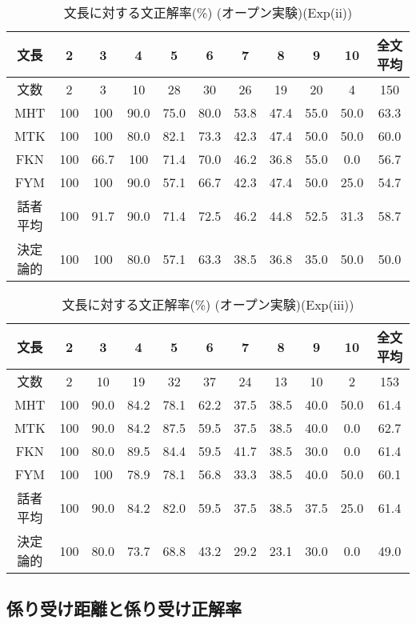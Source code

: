 \begin{table}
\begin{center}
\caption{文長に対する文正解率(\%) (オープン実験)(Exp(ii))}
\label{res:10}
\begin{tabular}{|c|c|c|c|c|c|c|c|c|c||c|}
\hline
文長		&2&3&4&5&6&7&8&9&10&全文平均 \\
\hline
\hline
文数		&2&3&10&28&30&26&19&20&4&150\\
\hline
MHT		&100&100  & 90.0&75.0&80.0&53.8&47.4&55.0&50.0&63.3\\
MTK		&100&100  & 80.0&82.1&73.3&42.3&47.4&50.0&50.0&60.0\\
FKN		&100& 66.7&100  &71.4&70.0&46.2&36.8&55.0& 0.0&56.7\\
FYM		&100&100  & 90.0&57.1&66.7&42.3&47.4&50.0&25.0&54.7\\
話者平均            &100& 91.7& 90.0&71.4&72.5&46.2&44.8&52.5&31.3&58.7\\
\hline
決定論的	&100&100&80.0&57.1&63.3&38.5&36.8&35.0&50.0&50.0\\
\hline
\end{tabular}
\end{center}
\end{table}
\vspace{-5mm}
\begin{table}
\begin{center}
\caption{文長に対する文正解率(\%) (オープン実験)(Exp(iii))}
\label{res:11}
\begin{tabular}{|c|c|c|c|c|c|c|c|c|c||c|}
\hline
文長		&2&3&4&5&6&7&8&9&10&全文平均 \\
\hline
\hline
文数		&2&10&19&32&37&24&13&10&2&153 \\
\hline
MHT		&100&90.0&84.2&78.1&62.2&37.5&38.5&40.0&50.0&61.4\\
MTK		&100&90.0&84.2&87.5&59.5&37.5&38.5&40.0&0.0&62.7\\
FKN		&100&80.0&89.5&84.4&59.5&41.7&38.5&30.0&0.0&61.4\\
FYM		&100&100 &78.9&78.1&56.8&33.3&38.5&40.0&50.0&60.1\\
話者平均            &100&90.0&84.2&82.0&59.5&37.5&38.5&37.5&25.0&61.4\\
\hline
決定論的	&100&80.0&73.7&68.8&43.2&29.2&23.1&30.0&0.0&49.0\\
\hline
\end{tabular}
\end{center}
\end{table}

\subsection{係り受け距離と係り受け正解率}

